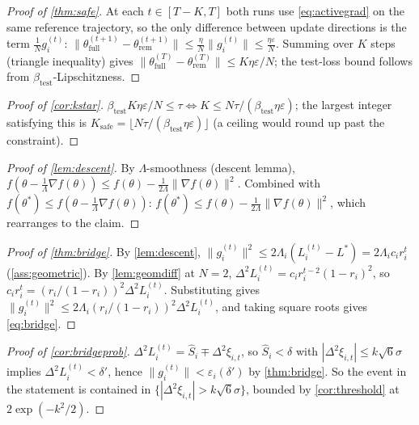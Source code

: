 \documentclass{article}
\theoremstyle{plain}
\theoremstyle{definition}
\theoremstyle{remark}
\begin{document}
\begin{proof}[Proof of \cref{thm:safe}]
At each $t\in[T-K,T]$ both runs use \cref{eq:activegrad} on the same reference trajectory, so the only difference between update directions is the term $\frac1N g_i^{(t)}$: $\|\theta^{(t+1)}_{\mathrm{full}} - \theta^{(t+1)}_{\mathrm{rem}}\| \le \frac{\eta}{N}\|g_i^{(t)}\| \le \frac{\eta\varepsilon}{N}$. Summing over $K$ steps (triangle inequality) gives $\|\theta^{(T)}_{\mathrm{full}} - \theta^{(T)}_{\mathrm{rem}}\| \le K\eta\varepsilon/N$; the test-loss bound follows from $\beta_{\mathrm{test}}$-Lipschitzness.
\end{proof}

\begin{proof}[Proof of \cref{cor:kstar}]
$\beta_{\mathrm{test}} K \eta \varepsilon/N \le \tau \iff K \le N\tau/(\beta_{\mathrm{test}}\eta\varepsilon)$; the largest integer satisfying this is $K_{\mathrm{safe}} = \lfloor N\tau/(\beta_{\mathrm{test}}\eta\varepsilon)\rfloor$ (a ceiling would round up past the constraint).
\end{proof}

\begin{proof}[Proof of \cref{lem:descent}]
By $\Lambda$-smoothness (descent lemma), $f(\theta-\tfrac1\Lambda\nabla f(\theta)) \le f(\theta) - \tfrac1{2\Lambda}\|\nabla f(\theta)\|^2$. Combined with $f(\theta^*)\le f(\theta-\tfrac1\Lambda\nabla f(\theta))$: $f(\theta^*) \le f(\theta)-\tfrac1{2\Lambda}\|\nabla f(\theta)\|^2$, which rearranges to the claim.
\end{proof}

\begin{proof}[Proof of \cref{thm:bridge}]
By \cref{lem:descent}, $\|g_i^{(t)}\|^2 \le 2\Lambda_i(L_i^{(t)}-L^*) = 2\Lambda_i c_i r_i^t$ (\cref{ass:geometric}). By \cref{lem:geomdiff} at $N=2$, $\Delta^2 L_i^{(t)} = c_i r_i^{t-2}(1-r_i)^2$, so $c_i r_i^t = (r_i/(1-r_i))^2\Delta^2 L_i^{(t)}$. Substituting gives $\|g_i^{(t)}\|^2 \le 2\Lambda_i(r_i/(1-r_i))^2\Delta^2 L_i^{(t)}$, and taking square roots gives \cref{eq:bridge}.
\end{proof}

\begin{proof}[Proof of \cref{cor:bridgeprob}]
$\Delta^2 L_i^{(t)} = \hat S_i \mp \Delta^2\xi_{i,t}$, so $\hat S_i<\delta$ with $|\Delta^2\xi_{i,t}|\le k\sqrt6\sigma$ implies $\Delta^2 L_i^{(t)} < \delta'$, hence $\|g_i^{(t)}\|<\varepsilon_i(\delta')$ by \cref{thm:bridge}. So the event in the statement is contained in $\{|\Delta^2\xi_{i,t}|>k\sqrt6\sigma\}$, bounded by \cref{cor:threshold} at $2\exp(-k^2/2)$.
\end{proof}
\end{document}

